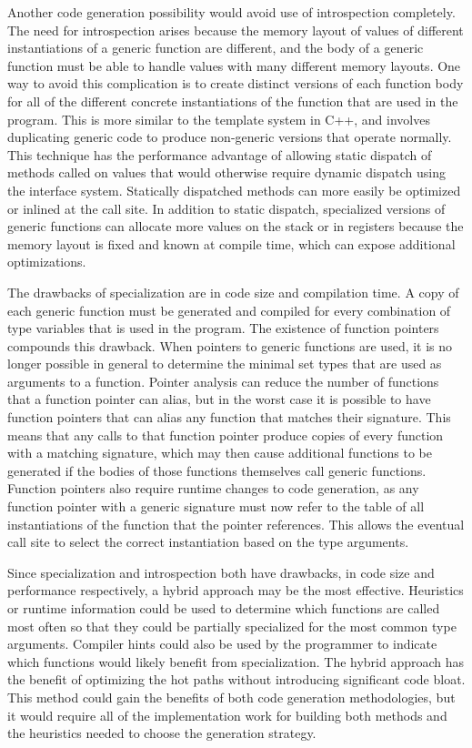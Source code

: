\documentclass[letterpaper,11pt]{article}
\begin{document}
Another code generation possibility would avoid use of introspection completely. The need for introspection arises because the memory layout of values of different instantiations of a generic function are different, and the body of a generic function must be able to handle values with many different memory layouts. One way to avoid this complication is to create distinct versions of each function body for all of the different concrete instantiations of the function that are used in the program. This is more similar to the template system in C++, and involves duplicating generic code to produce non-generic versions that  operate normally. This technique has the performance advantage of allowing static dispatch of methods called on values that would otherwise require dynamic dispatch using the interface system. Statically dispatched methods can more easily be optimized or inlined at the call site. In addition to static dispatch, specialized versions of generic functions can allocate more values on the stack or in registers because the memory layout is fixed and known at compile time, which can expose additional optimizations. 

The drawbacks of specialization are in code size and compilation time. A copy of each generic function must be generated and compiled for every combination of type variables that is used in the program. The existence of function pointers compounds this drawback. When pointers to generic functions are used, it is no longer possible in general to determine the minimal set types that are used as arguments to a function. Pointer analysis can reduce the number of functions that a function pointer can alias, but in the worst case it is possible to have function pointers that can alias any function that matches their signature. This means that any calls to that function pointer produce copies of every function with a matching signature, which may then cause additional functions to be generated if the bodies of those functions themselves call generic functions. Function pointers also require runtime changes to code generation, as any function pointer with a generic signature must now refer to the table of all instantiations of the function that the pointer references. This allows the eventual call site to select the correct instantiation based on the type arguments. 

Since specialization and introspection both have drawbacks, in code size and performance respectively, a hybrid approach may be the most effective. Heuristics or runtime information could be used to determine which functions are called most often so that they could be partially specialized for the most common type arguments. Compiler hints could also be used by the programmer to indicate which functions would likely benefit from specialization. The hybrid approach has the benefit of optimizing the hot paths without introducing significant code bloat. This method could gain the benefits of both code generation methodologies, but it would require all of the implementation work for building both methods and the heuristics needed to choose the generation strategy.
\end{document}
